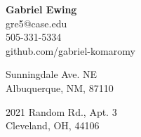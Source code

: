 \documentclass[11pt]{article}
\begin{document}
\newcommand{\ressection}[1]{\setul{2pt}{.4pt}\large{\textbf{\ul{#1}}\\[0.3\baselineskip]}}
\newcommand{\eosec}[0]{~\\[0.6\baselineskip]}

\begin{center}\Large{\textbf{Gabriel Ewing}}\\[0.5\baselineskip]
    \large{gre5@case.edu}\\
    \large{505-331-5334}\\
    github.com/gabriel-komaromy
\end{center}
\begin{paracol}{2}
    \begin{flushleft}
     Sunningdale Ave. NE\\
    Albuquerque, NM, 87110
\end{flushleft}
    \switchcolumn
    \noindent \begin{flushright}2021 Random Rd., Apt. 3\\
    Cleveland, OH, 44106\end{flushright}
\end{paracol}
\end{document}
